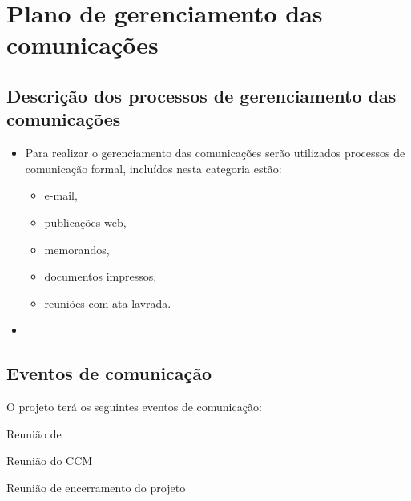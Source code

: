 
\chapter{Plano de gerenciamento das comunicações}
\label{ch:communication-management-plan}

\section{Descrição dos processos de gerenciamento das comunicações}


\begin{itemize}
\item Para realizar o gerenciamento das comunicações serão utilizados processos de comunicação formal, incluídos nesta categoria estão:
\begin{itemize}
\item e-mail,
\item publicações web,
\item memorandos,
\item documentos impressos,
\item reuniões com ata lavrada.
\end{itemize}
\item 
\end{itemize}

\section{Eventos de comunicação}

O projeto terá os seguintes eventos de comunicação:

\begin{description}
\item Reunião de 
\item Reunião do CCM
\item Reunião de encerramento do projeto
\end{description}

